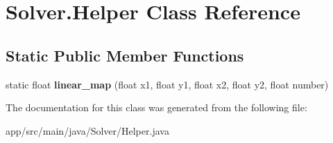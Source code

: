 \hypertarget{classSolver_1_1Helper}{}\section{Solver.\+Helper Class Reference}
\label{classSolver_1_1Helper}
\subsection*{Static Public Member Functions}
\begin{DoxyCompactItemize}
\item 
\mbox{\label{classSolver_1_1Helper_ab4e2ecd76f5062902111a42657f748af}} 
static float {\bfseries linear\+\_\+map} (float x1, float y1, float x2, float y2, float number)
\end{DoxyCompactItemize}


The documentation for this class was generated from the following file\+:\begin{DoxyCompactItemize}
\item 
app/src/main/java/\+Solver/Helper.\+java\end{DoxyCompactItemize}

